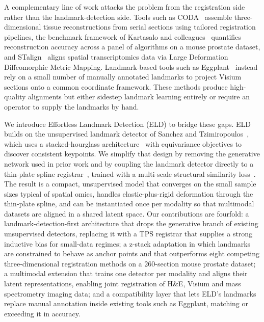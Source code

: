 \documentclass[11pt]{article}
\begin{document}
A complementary line of work attacks the problem from the registration side rather than the landmark-detection side. Tools such as CODA~\cite{kiemen2022coda} assemble three-dimensional tissue reconstructions from serial sections using tailored registration pipelines, the benchmark framework of Kartasalo and colleagues~\cite{kartasalo2018comparative} quantifies reconstruction accuracy across a panel of algorithms on a mouse prostate dataset, and STalign~\cite{clifton2023stalign} aligns spatial transcriptomics data via Large Deformation Diffeomorphic Metric Mapping. Landmark-based tools such as Eggplant~\cite{bergenstrahle2021eggplant} instead rely on a small number of manually annotated landmarks to project Visium sections onto a common coordinate framework. These methods produce high-quality alignments but either sidestep landmark learning entirely or require an operator to supply the landmarks by hand.

We introduce Effortless Landmark Detection (ELD) to bridge these gaps. ELD builds on the unsupervised landmark detector of Sanchez and Tzimiropoulos~\cite{sanchez2019object}, which uses a stacked-hourglass architecture~\cite{newell2016stacked} with equivariance objectives to discover consistent keypoints. We simplify that design by removing the generative network used in prior work and by coupling the landmark detector directly to a thin-plate spline registrar~\cite{bookstein1989principal,keller2020thinplate}, trained with a multi-scale structural similarity loss~\cite{wang2003multiscale,wang2004image}. The result is a compact, unsupervised model that converges on the small sample sizes typical of spatial omics, handles elastic-plus-rigid deformation through the thin-plate spline, and can be instantiated once per modality so that multimodal datasets are aligned in a shared latent space. Our contributions are fourfold: a landmark-detection-first architecture that drops the generative branch of existing unsupervised detectors, replacing it with a TPS registrar that supplies a strong inductive bias for small-data regimes; a z-stack adaptation in which landmarks are constrained to behave as anchor points and that outperforms eight competing three-dimensional registration methods on a 260-section mouse prostate dataset; a multimodal extension that trains one detector per modality and aligns their latent representations, enabling joint registration of H\&E, Visium and mass spectrometry imaging data; and a compatibility layer that lets ELD's landmarks replace manual annotation inside existing tools such as Eggplant, matching or exceeding it in accuracy.
\end{document}
